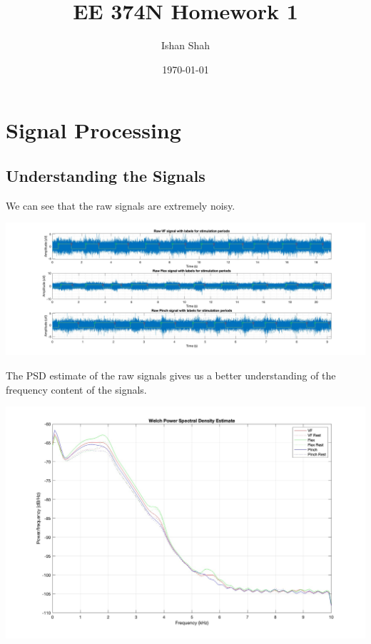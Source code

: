 \documentclass[12pt]{article}
\begin{document}
\title{EE 374N Homework 1}
\author{Ishan Shah}
\date{\today}
\maketitle

\section{Signal Processing}
\subsection{Understanding the Signals}
We can see that the raw signals are extremely noisy.

\begin{center}
    \includegraphics[width=\textwidth]{raw_signals.jpg}
\end{center}

The PSD estimate of the raw signals gives us a better understanding of the frequency content of the signals.

\begin{center}
    \includegraphics[width=\textwidth]{psd.jpg}
\end{center}
\end{document}

